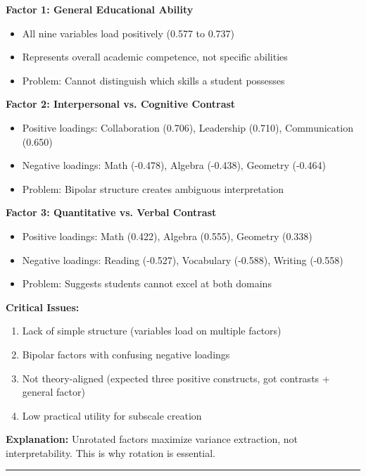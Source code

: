 \documentclass[
]{article}
\begin{document}
\textbf{Factor 1: General Educational Ability}

\begin{itemize}
\item
  All nine variables load positively (0.577 to 0.737)
\item
  Represents overall academic competence, not specific abilities
\item
  Problem: Cannot distinguish which skills a student possesses
\end{itemize}

\textbf{Factor 2: Interpersonal vs. Cognitive Contrast}

\begin{itemize}
\item
  Positive loadings: Collaboration (0.706), Leadership (0.710),
  Communication (0.650)
\item
  Negative loadings: Math (-0.478), Algebra (-0.438), Geometry (-0.464)
\item
  Problem: Bipolar structure creates ambiguous interpretation
\end{itemize}

\textbf{Factor 3: Quantitative vs. Verbal Contrast}

\begin{itemize}
\item
  Positive loadings: Math (0.422), Algebra (0.555), Geometry (0.338)
\item
  Negative loadings: Reading (-0.527), Vocabulary (-0.588), Writing
  (-0.558)
\item
  Problem: Suggests students cannot excel at both domains
\end{itemize}

\textbf{Critical Issues:}

\begin{enumerate}
\item
  Lack of simple structure (variables load on multiple factors)
\item
  Bipolar factors with confusing negative loadings
\item
  Not theory-aligned (expected three positive constructs, got contrasts
  + general factor)
\item
  Low practical utility for subscale creation
\end{enumerate}

\textbf{Explanation:} Unrotated factors maximize variance extraction,
not interpretability. This is why rotation is essential.

\begin{center}\rule{0.5\linewidth}{0.5pt}\end{center}
\end{document}
